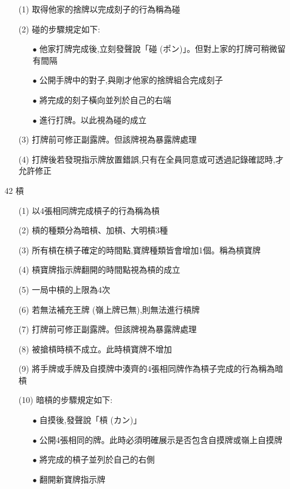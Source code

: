 \documentclass[a4paper,12pt]{article}
\begin{document}
\begin{itemize}
    \begin{itemize}
        \item[(1)] 取得他家的捨牌以完成刻子的行為稱為碰
        \item[(2)] 碰的步驟規定如下:
        \begin{itemize}
            \item[$\bullet$] 他家打牌完成後,立刻發聲說「碰 (ポン)」。但對上家的打牌可稍微留有間隔
            \item[$\bullet$] 公開手牌中的對子,與剛才他家的捨牌組合完成刻子
            \item[$\bullet$] 將完成的刻子橫向並列於自己的右端
            \item[$\bullet$] 進行打牌。以此視為碰的成立
        \end{itemize}
        \item[(3)] 打牌前可修正副露牌。但該牌視為暴露牌處理
        \item[(4)] 打牌後若發現指示牌放置錯誤,只有在全員同意或可透過記錄確認時,才允許修正
    \end{itemize}
    \item[42] 槓
    \begin{itemize}
        \item[(1)] 以4張相同牌完成槓子的行為稱為槓
        \item[(2)] 槓的種類分為暗槓、加槓、大明槓3種
        \item[(3)] 所有槓在槓子確定的時間點,寶牌種類皆會增加1個。稱為槓寶牌
        \item[(4)] 槓寶牌指示牌翻開的時間點視為槓的成立
        \item[(5)] 一局中槓的上限為4次
        \item[(6)] 若無法補充王牌 (嶺上牌已無),則無法進行槓牌
        \item[(7)] 打牌前可修正副露牌。但該牌視為暴露牌處理
        \item[(8)] 被搶槓時槓不成立。此時槓寶牌不增加
        \item[(9)] 將手牌或手牌及自摸牌中湊齊的4張相同牌作為槓子完成的行為稱為暗槓
        \item[(10)] 暗槓的步驟規定如下:
        \begin{itemize}
            \item[$\bullet$] 自摸後,發聲說「槓 (カン)」
            \item[$\bullet$] 公開4張相同的牌。此時必須明確展示是否包含自摸牌或嶺上自摸牌
            \item[$\bullet$] 將完成的槓子並列於自己的右側
            \item[$\bullet$] 翻開新寶牌指示牌

\end{itemize}
\end{itemize}
\end{itemize}
\end{document}

